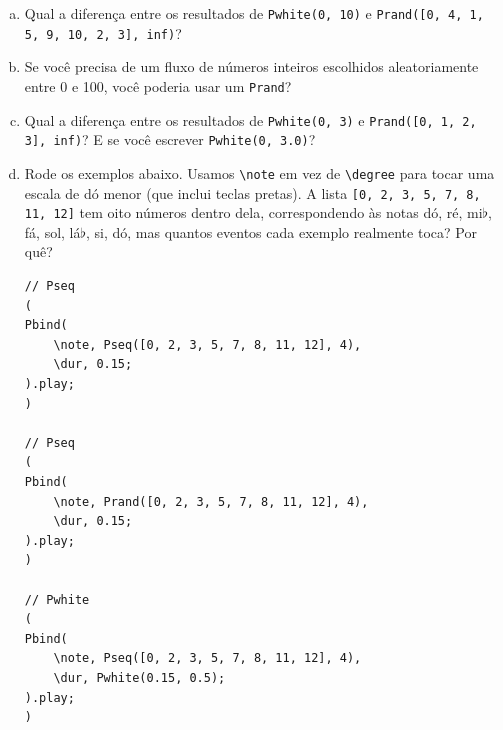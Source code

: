 \begin{enumerate}[a)]
\item Qual a diferença entre os resultados de \texttt{Pwhite(0, 10)} e \texttt{Prand([0, 4, 1, 5, 9, 10, 2, 3], inf)}?

\item Se você precisa de um fluxo de números inteiros escolhidos aleatoriamente entre 0 e 100, você poderia usar um \texttt{Prand}?

\item Qual a diferença entre os resultados de \texttt{Pwhite(0, 3)} e \texttt{Prand([0, 1, 2, 3], inf)}? E se você escrever \texttt{Pwhite(0, 3.0)}?

\item  Rode os exemplos abaixo. Usamos \texttt{\textbackslash note} em vez de \texttt{\textbackslash degree} para tocar uma escala de dó menor (que inclui teclas pretas). A lista \texttt{[0, 2, 3, 5, 7, 8, 11, 12]} tem oito números dentro dela, correspondendo às notas dó, ré, mi$\flat$, fá, sol, lá$\flat$, si, dó, mas quantos eventos cada exemplo realmente toca? Por quê?

 
\begin{lstlisting}[style=SuperCollider-IDE, basicstyle=\scttfamily\footnotesize]
// Pseq
(
Pbind(
	\note, Pseq([0, 2, 3, 5, 7, 8, 11, 12], 4),
	\dur, 0.15;
).play;
)

// Pseq
(
Pbind(
	\note, Prand([0, 2, 3, 5, 7, 8, 11, 12], 4),
	\dur, 0.15;
).play;
)

// Pwhite
(
Pbind(
	\note, Pseq([0, 2, 3, 5, 7, 8, 11, 12], 4),
	\dur, Pwhite(0.15, 0.5);
).play;
)
\end{lstlisting}

\end{enumerate}


